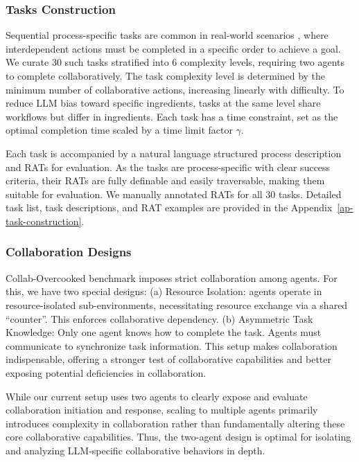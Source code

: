 \documentclass[11pt]{article}
\begin{document}
\subsubsection{Tasks Construction}

Sequential process-specific tasks are common in real-world scenarios \cite{wang2023describe,zhang2023building,song2024trial}, where interdependent actions must be completed in a specific order to achieve a goal. We curate 30 such tasks stratified into 6 complexity levels, requiring two agents to complete collaboratively. The task complexity level is determined by the minimum number of collaborative actions, increasing linearly with difficulty. To reduce LLM bias toward specific ingredients, tasks at the same level share workflows but differ in ingredients. Each task has a time constraint, set as the optimal completion time scaled by a time limit factor $\gamma$.

Each task is accompanied by a natural language structured process description and RATs for evaluation. As the tasks are process-specific with clear success criteria, their RATs are fully definable and easily traversable, making them suitable for evaluation. We manually annotated RATs for all 30 tasks. Detailed task list, task descriptions, and RAT examples are provided in the Appendix~\ref{ap-task-construction}.


\subsubsection{Collaboration Designs}

Collab-Overcooked benchmark imposes strict collaboration among agents. For this, we have two special designs: (a) Resource Isolation: agents operate in resource-isolated sub-environments, necessitating resource exchange via a shared ``counter''. This enforces collaborative dependency. (b) Asymmetric Task Knowledge: Only one agent knows how to complete the task. Agents must communicate to synchronize task information. This setup makes collaboration indispensable, offering a stronger test of collaborative capabilities and better exposing potential deficiencies in collaboration.

While our current setup uses two agents to clearly expose and evaluate collaboration initiation and response, scaling to multiple agents primarily introduces complexity in collaboration rather than fundamentally altering these core collaborative capabilities. Thus, the two-agent design is optimal for isolating and analyzing LLM-specific collaborative behaviors in depth.
\end{document}
